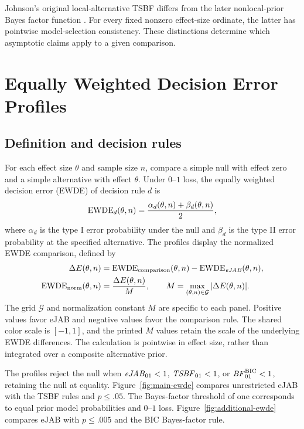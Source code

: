 \documentclass[11pt,letterpaper]{article}
\begin{document}
Johnson's original local-alternative TSBF differs from the later
nonlocal-prior Bayes factor function
\citep{johnson2005bayes,johnson2023bff}. For every fixed nonzero
effect-size ordinate, the latter has pointwise model-selection
consistency. These distinctions determine which asymptotic claims apply
to a given comparison.

\section{Equally Weighted Decision Error Profiles}
\subsection{Definition and decision rules}
For each effect size \(\theta\) and sample size \(n\), compare a simple
null with effect zero and a simple alternative with effect \(\theta\).
Under \(0\)--\(1\) loss, the equally weighted decision error (EWDE) of
decision rule \(d\) is
\begin{equation}
 \operatorname{EWDE}_d(\theta,n)=
 \frac{\alpha_d(\theta,n)+\beta_d(\theta,n)}{2},
 \label{eq:ewde}
\end{equation}
where \(\alpha_d\) is the type I error probability under the null and
\(\beta_d\) is the type II error probability at the specified
alternative. The profiles display the normalized EWDE comparison,
defined by
\begin{align}
 \Delta E(\theta,n)&=\operatorname{EWDE}_{\mathrm{comparison}}(\theta,n)
                         -\operatorname{EWDE}_{\mathit{eJAB}}(\theta,n),\nonumber\\
 \operatorname{EWDE}_{\mathrm{norm}}(\theta,n)&=\frac{\Delta E(\theta,n)}{M},
 \qquad
 M=\max_{(\theta,n)\in\mathcal G}|\Delta E(\theta,n)| .
 \label{eq:normalized-ewde}
\end{align}
The grid \(\mathcal G\) and normalization constant \(M\) are specific to
each panel. Positive values favor eJAB and negative values favor the
comparison rule. The shared color scale is \([-1,1]\), and the printed
\(M\) values retain the scale of the underlying EWDE differences.
The calculation is pointwise in effect size, rather than integrated over
a composite alternative prior.

The profiles reject the null when \(\mathit{eJAB}_{01}<1\), \(\mathit{TSBF}_{01}<1\),
or \(\mathit{BF}_{01}^{\mathrm{BIC}}<1\), retaining the null at equality.
Figure~\ref{fig:main-ewde} compares unrestricted eJAB with the TSBF rules and \(p\leq.05\).
The Bayes-factor threshold of one corresponds to equal prior model
probabilities and \(0\)--\(1\) loss. Figure~\ref{fig:additional-ewde}
compares eJAB with \(p\leq.005\) and the BIC Bayes-factor rule.
\end{document}
